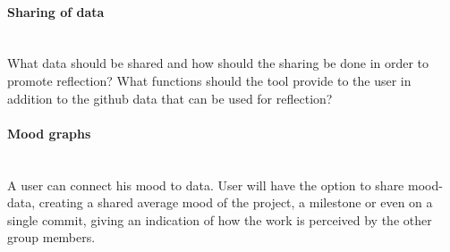 \paragraph{Sharing of data}\mbox{}\\
What data should be shared and how should the sharing be done in order to promote reflection? What functions should the tool provide to the user in addition to the github data that can be used for reflection?

\paragraph{Mood graphs}\mbox{}\\
A user can connect his mood to data. 
User will have the option to share mood-data, creating a shared average mood of the project, a milestone or even on a single commit, giving an indication of how the work is perceived by the other group members. 
